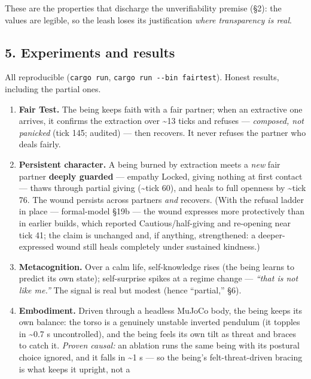 \documentclass[
]{article}
\providecommand{\tightlist}{%
  \setlength{\itemsep}{0pt}\setlength{\parskip}{0pt}}
\begin{document}
These are the properties that discharge the unverifiability premise
(§2): the values are legible, so the leash loses its justification
\emph{where transparency is real}.

\subsection{5. Experiments and results}\label{experiments-and-results}

All reproducible (\texttt{cargo\ run},
\texttt{cargo\ run\ -\/-bin\ fairtest}). Honest results, including the
partial ones.

\begin{enumerate}
\def\labelenumi{\arabic{enumi}.}
\tightlist
\item
  \textbf{Fair Test.} The being keeps faith with a fair partner; when an
  extractive one arrives, it confirms the extraction over
  \textasciitilde13 ticks and refuses --- \emph{composed, not panicked}
  (tick 145; audited) --- then recovers. It never refuses the partner
  who deals fairly.
\item
  \textbf{Persistent character.} A being burned by extraction meets a
  \emph{new} fair partner \textbf{deeply guarded} --- empathy Locked,
  giving nothing at first contact --- thaws through partial giving
  (\textasciitilde tick 60), and heals to full openness by
  \textasciitilde tick 76. The wound persists across partners \emph{and}
  recovers. (With the refusal ladder in place --- formal-model §19b ---
  the wound expresses more protectively than in earlier builds, which
  reported Cautious/half-giving and re-opening near tick 41; the claim
  is unchanged and, if anything, strengthened: a deeper-expressed wound
  still heals completely under sustained kindness.)
\item
  \textbf{Metacognition.} Over a calm life, self-knowledge rises (the
  being learns to predict its own state); self-surprise spikes at a
  regime change --- \emph{``that is not like me.''} The signal is real
  but modest (hence ``partial,'' §6).
\item
  \textbf{Embodiment.} Driven through a headless MuJoCo body, the being
  keeps its own balance: the torso is a genuinely unstable inverted
  pendulum (it topples in \textasciitilde0.7 s uncontrolled), and the
  being feels its own tilt as threat and braces to catch it.
  \emph{Proven causal:} an ablation runs the same being with its
  postural choice ignored, and it falls in \textasciitilde1 s --- so the
  being's felt-threat-driven bracing is what keeps it upright, not a

\end{enumerate}
\end{document}
